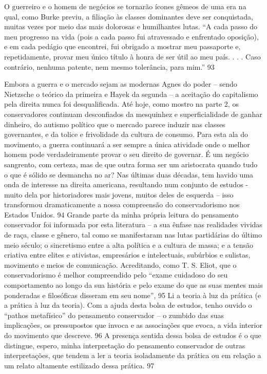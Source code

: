  
\par
 
O guerreiro e o homem de negócios se tornarão ícones gêmeos de uma era na qual, como Burke previu, a filiação às classes dominantes deve ser conquistada, muitas vezes por meio das mais dolorosas e humilhantes lutas. “A cada passo do meu progresso na vida (pois a cada passo fui atravessado e enfrentado oposição), e em cada pedágio que encontrei, fui obrigado a mostrar meu passaporte e, repetidamente, provar meu único título à honra de ser útil ao meu país. . . . Caso contrário, nenhuma patente, nem mesmo tolerância, para mim.”
 {\color{blue} 93}  

 
\par
 
Embora a guerra e o mercado sejam as modernas Agnes do poder – sendo Nietzsche o teórico da primeira e Hayek da segunda – a aceitação do capitalismo pela direita nunca foi desqualificada. Até hoje, como mostro na parte 2, os conservadores continuam desconfiados da mesquinhez e superficialidade de ganhar dinheiro, do autismo político que o mercado parece induzir nas classes governantes, e da tolice e frivolidade da cultura de consumo. Para esta ala do movimento, a guerra continuará a ser sempre a única atividade onde o melhor homem pode verdadeiramente provar o seu direito de governar. É um negócio sangrento, com certeza, mas de que outra forma ser um aristocrata quando tudo o que é sólido se desmancha no ar? Nas últimas duas décadas, tem havido uma onda de interesse na direita americana, resultando num conjunto de estudos - muito dela por historiadores mais jovens, muitos deles de esquerda – isso transformou dramaticamente a nossa compreensão do conservadorismo nos Estados Unidos.
 {\color{blue} 94}  
Grande parte da minha própria leitura do pensamento conservador foi informada por esta literatura – a sua ênfase nas realidades vividas de raça, classe e gênero, tal como se manifestaram nas lutas partidárias do último meio século; o sincretismo entre a alta política e a cultura de massa; e a tensão criativa entre elites e ativistas, empresários e intelectuais, subúrbios e sulistas, movimento e meios de comunicação. Acreditando, como T. S. Eliot, que o conservadorismo é melhor compreendido pelo “exame cuidadoso do seu comportamento ao longo da sua história e pelo exame do que as suas mentes mais ponderadas e filosóficas disseram em seu nome”,
 {\color{blue} 95}  
Li a teoria à luz da prática (e a prática à luz da teoria). Com a ajuda desta bolsa de estudos, tenho ouvido o “pathos metafísico” do pensamento conservador – o zumbido das suas implicações, os pressupostos que invoca e as associações que evoca, a vida interior do movimento que descreve.
 {\color{blue} 96}  
A presença sentida dessa bolsa de estudos é o que distingue, espero, minha interpretação do pensamento conservador de outras interpretações, que tendem a ler a teoria isoladamente da prática ou em relação a um relato altamente estilizado dessa prática.
 {\color{blue} 97}  

